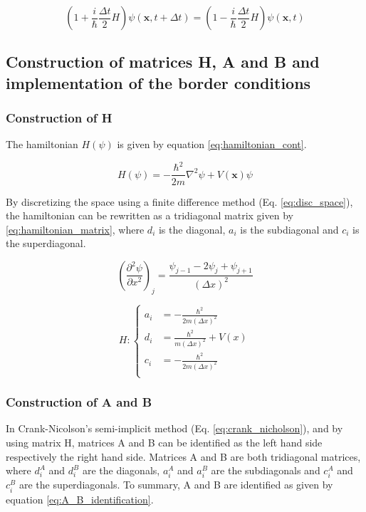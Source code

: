 \documentclass[a4paper,12pt,twoside]{article}
\newcommand{\mbf}[1]{\mathbf{#1}} %
\newcommand{\bracket}[1]{\left(#1\right)}
\begin{document}
    \begin{equation}
      \bracket{1 + \frac{i}{\hbar}\frac{\Delta t}{2}H}\psi(\mbf{x}, t + \Delta t) = \bracket{1 - \frac{i}{\hbar}\frac{\Delta t}{2}H}\psi(\mbf{x}, t)
      \label{eq:crank_nicholson}
    \end{equation}



  \subsection{Construction of matrices H, A and B and implementation of the border conditions}
    \subsubsection{Construction of H}\label{sec:constr_H}
      The hamiltonian $H(\psi)$ is given by equation \eqref{eq:hamiltonian_cont}.

      \begin{equation}
        H(\psi) = -\frac{\hbar^2}{2m}\nabla^2\psi + V(\mbf{x})\psi
        \label{eq:hamiltonian_cont}
      \end{equation}

      By discretizing the space using a finite difference method (Eq. \eqref{eq:disc_space}), the hamiltonian can be rewritten as a tridiagonal matrix given by \eqref{eq:hamiltonian_matrix}, where $d_i$ is the diagonal, $a_i$ is the subdiagonal and $c_i$ is the superdiagonal.

      \begin{equation}
        \bracket{\frac{\partial^2\psi}{\partial x^2}}_j = \frac{\psi_{j-1} - 2\psi_j + \psi_{j+1}}{\bracket{\Delta x}^2}
        \label{eq:disc_space}
      \end{equation}

      \begin{equation}
        H: \begin{cases}
          a_i &= -\frac{\hbar^2}{2m(\Delta x)^2}\\
          d_i &= \frac{\hbar^2}{m(\Delta x)^2} + V(x)\\
          c_i &= -\frac{\hbar^2}{2m(\Delta x)^2}\\
        \end{cases}
        \label{eq:hamiltonian_matrix}
      \end{equation}

    \subsubsection{Construction of A and B}
      In Crank-Nicolson's semi-implicit method (Eq. \eqref{eq:crank_nicholson}), and by using matrix H, matrices A and B can be identified as the left hand side respectively the right hand side.
      Matrices A and B are both tridiagonal matrices, where $d_i^A$ and $d_i^B$ are the diagonals, $a_i^A$ and $a_i^B$ are the subdiagonals and $c_i^A$ and $c_i^B$ are the superdiagonals.
      To summary, A and B are identified as given by equation \eqref{eq:A_B_identification}.
\end{document}
